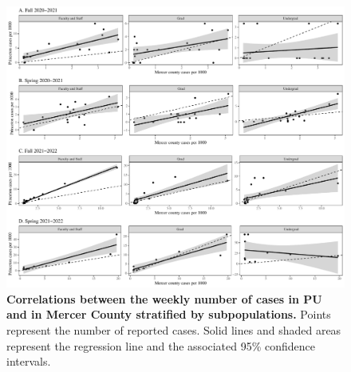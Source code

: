 \documentclass[12pt]{article}
\begin{document}
\pagebreak

\begin{figure}[!htp]
\includegraphics[width=\textwidth]{../figure_princeton_new/figure_princeton_correlation_per_1000.pdf}
\caption{
\textbf{Correlations between the weekly number of cases in PU and in Mercer County stratified by subpopulations.}
Points represent the number of reported cases.
Solid lines and shaded areas represent the regression line and the associated 95\% confidence intervals.
}
\end{figure}

\pagebreak
\end{document}
